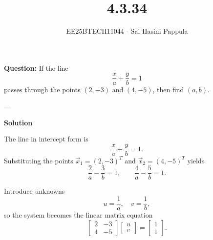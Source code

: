 \documentclass[journal]{IEEEtran}
\begin{document}

\vspace{3cm}

\title{4.3.34}
\author{EE25BTECH11044 - Sai Hasini Pappula}
 \maketitle
{\let\newpage\relax\maketitle}

\renewcommand{\thefigure}{\theenumi}
\renewcommand{\thetable}{\theenumi}
\setlength{\intextsep}{10pt} 

\renewcommand{\thetable}{\theenumi}

\textbf{Question:}  
If the line 
\[
\frac{x}{a} + \frac{y}{b} = 1
\]
passes through the points $(2,-3)$ and $(4,-5)$, then find $(a,b)$. 

---

\textbf{Solution}

The line in intercept form is
\begin{equation}
\frac{x}{a} + \frac{y}{b} = 1.
\end{equation}
Substituting the points $\vec{x}_1=(2,-3)^T$ and $\vec{x}_2=(4,-5)^T$ yields
\begin{equation}
\frac{2}{a} - \frac{3}{b} = 1, \qquad
\frac{4}{a} - \frac{5}{b} = 1.
\end{equation}

Introduce unknowns
\begin{equation}
u=\frac{1}{a}, \quad v=\frac{1}{b},
\end{equation}
so the system becomes the linear matrix equation
\begin{equation}
\begin{bmatrix}
2 & -3\\[4pt]
4 & -5
\end{bmatrix}
\begin{bmatrix} u\\[2pt] v\end{bmatrix}
=
\begin{bmatrix}1\\[2pt]1\end{bmatrix}.
\end{equation}
\end{document}
